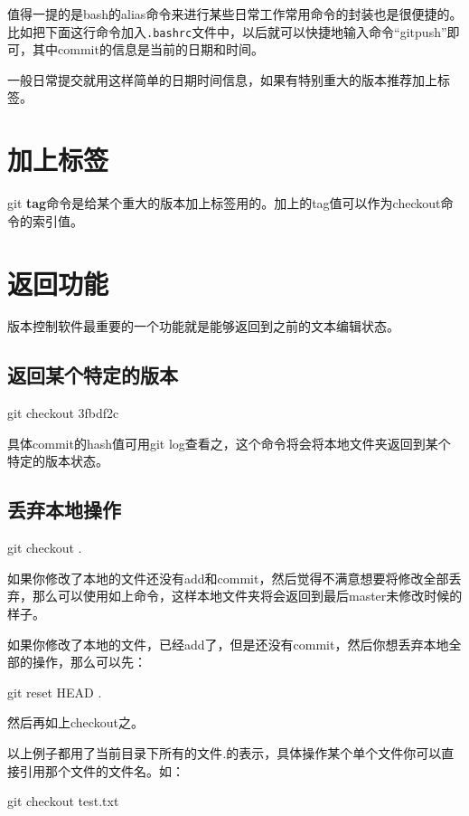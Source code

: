 \documentclass[11pt,oneside]{book}
\begin{document}
值得一提的是bash的alias命令来进行某些日常工作常用命令的封装也是很便捷的。比如把下面这行命令加入\verb+.bashrc+文件中，以后就可以快捷地输入命令“gitpush”即可，其中commit的信息是当前的日期和时间。

一般日常提交就用这样简单的日期时间信息，如果有特别重大的版本推荐加上标签。
\section{加上标签}
git \textbf{tag}命令是给某个重大的版本加上标签用的。加上的tag值可以作为checkout命令的索引值。

\section{返回功能}
版本控制软件最重要的一个功能就是能够返回到之前的文本编辑状态。


\subsection{返回某个特定的版本}
\begin{tcbbash}[]
git checkout  3fbdf2c
\end{tcbbash}

具体commit的hash值可用git log查看之，这个命令将会将本地文件夹返回到某个特定的版本状态。

\subsection{丢弃本地操作}
\begin{tcbbash}[]
git  checkout    .
\end{tcbbash}
如果你修改了本地的文件还没有add和commit，然后觉得不满意想要将修改全部丢弃，那么可以使用如上命令，这样本地文件夹将会返回到最后master未修改时候的样子。

如果你修改了本地的文件，已经add了，但是还没有commit，然后你想丢弃本地全部的操作，那么可以先：
\begin{tcbbash}[]
git  reset HEAD  .
\end{tcbbash}
然后再如上checkout之。

以上例子都用了当前目录下所有的文件\emph{.}的表示，具体操作某个单个文件你可以直接引用那个文件的文件名。如：
\begin{tcbbash}[]
git  checkout test.txt
\end{tcbbash}
\end{document}
